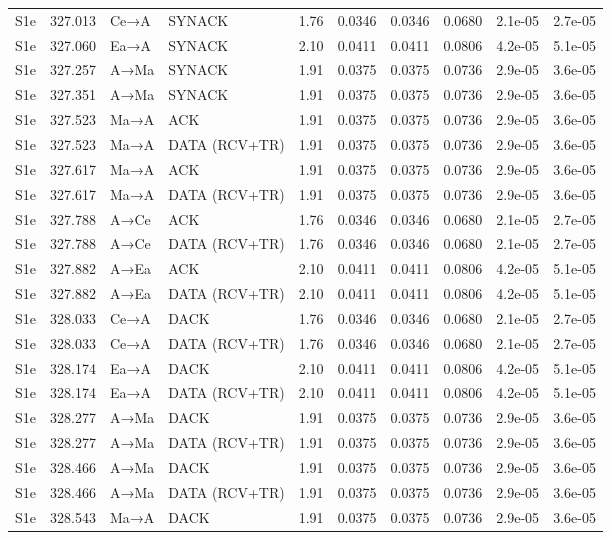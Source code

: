 \documentclass[10pt,letterpaper]{article}
\begin{document}
{\begin{longtable}{@{}lrllrrrrrr@{}}
S1e & 327.013 & Ce→A & SYNACK & 1.76 & 0.0346 & 0.0346 & 0.0680 & 2.1e-05 & 2.7e-05 \\
S1e & 327.060 & Ea→A & SYNACK & 2.10 & 0.0411 & 0.0411 & 0.0806 & 4.2e-05 & 5.1e-05 \\
S1e & 327.257 & A→Ma & SYNACK & 1.91 & 0.0375 & 0.0375 & 0.0736 & 2.9e-05 & 3.6e-05 \\
S1e & 327.351 & A→Ma & SYNACK & 1.91 & 0.0375 & 0.0375 & 0.0736 & 2.9e-05 & 3.6e-05 \\
S1e & 327.523 & Ma→A & ACK & 1.91 & 0.0375 & 0.0375 & 0.0736 & 2.9e-05 & 3.6e-05 \\
S1e & 327.523 & Ma→A & DATA (RCV+TR) & 1.91 & 0.0375 & 0.0375 & 0.0736 & 2.9e-05 & 3.6e-05 \\
S1e & 327.617 & Ma→A & ACK & 1.91 & 0.0375 & 0.0375 & 0.0736 & 2.9e-05 & 3.6e-05 \\
S1e & 327.617 & Ma→A & DATA (RCV+TR) & 1.91 & 0.0375 & 0.0375 & 0.0736 & 2.9e-05 & 3.6e-05 \\
S1e & 327.788 & A→Ce & ACK & 1.76 & 0.0346 & 0.0346 & 0.0680 & 2.1e-05 & 2.7e-05 \\
S1e & 327.788 & A→Ce & DATA (RCV+TR) & 1.76 & 0.0346 & 0.0346 & 0.0680 & 2.1e-05 & 2.7e-05 \\
S1e & 327.882 & A→Ea & ACK & 2.10 & 0.0411 & 0.0411 & 0.0806 & 4.2e-05 & 5.1e-05 \\
S1e & 327.882 & A→Ea & DATA (RCV+TR) & 2.10 & 0.0411 & 0.0411 & 0.0806 & 4.2e-05 & 5.1e-05 \\
S1e & 328.033 & Ce→A & DACK & 1.76 & 0.0346 & 0.0346 & 0.0680 & 2.1e-05 & 2.7e-05 \\
S1e & 328.033 & Ce→A & DATA (RCV+TR) & 1.76 & 0.0346 & 0.0346 & 0.0680 & 2.1e-05 & 2.7e-05 \\
S1e & 328.174 & Ea→A & DACK & 2.10 & 0.0411 & 0.0411 & 0.0806 & 4.2e-05 & 5.1e-05 \\
S1e & 328.174 & Ea→A & DATA (RCV+TR) & 2.10 & 0.0411 & 0.0411 & 0.0806 & 4.2e-05 & 5.1e-05 \\
S1e & 328.277 & A→Ma & DACK & 1.91 & 0.0375 & 0.0375 & 0.0736 & 2.9e-05 & 3.6e-05 \\
S1e & 328.277 & A→Ma & DATA (RCV+TR) & 1.91 & 0.0375 & 0.0375 & 0.0736 & 2.9e-05 & 3.6e-05 \\
S1e & 328.466 & A→Ma & DACK & 1.91 & 0.0375 & 0.0375 & 0.0736 & 2.9e-05 & 3.6e-05 \\
S1e & 328.466 & A→Ma & DATA (RCV+TR) & 1.91 & 0.0375 & 0.0375 & 0.0736 & 2.9e-05 & 3.6e-05 \\
S1e & 328.543 & Ma→A & DACK & 1.91 & 0.0375 & 0.0375 & 0.0736 & 2.9e-05 & 3.6e-05 \\

\end{longtable}}
\end{document}
